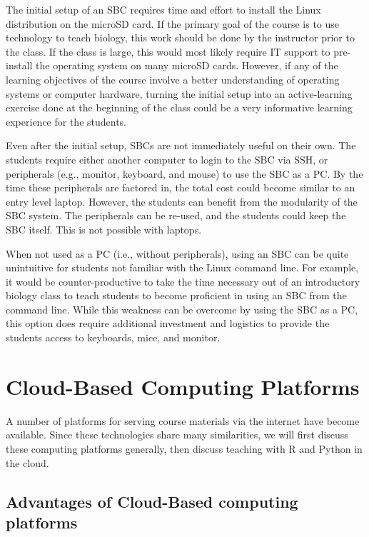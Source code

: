 The initial setup of an SBC requires time and effort to install the
Linux distribution on the microSD card.
If the primary goal of the course is to use technology to teach biology,
this work should be done by the instructor prior to the class.
If the class is large, this would most likely require IT support to pre-install
the operating system on many microSD cards.
However, if any of the learning objectives of the course involve
a better understanding of operating systems or computer hardware,
turning the initial setup into an active-learning exercise done
at the beginning of the class could be a very informative
learning experience for the students.

Even after the initial setup, SBCs are not immediately useful on their own.
The students require either another computer to login to the SBC via SSH, or
peripherals (e.g., monitor, keyboard, and mouse) to use the SBC as a PC.
By the time these peripherals are factored in, the total cost could become
similar to an entry level laptop.
However, the students can benefit from the modularity of the SBC system.
The peripherals can be re-used, and the students could keep the SBC itself.
This is not possible with laptops.

When not used as a PC (i.e., without peripherals), using an SBC can be
quite unintuitive for students not familiar with the Linux command line.
For example, it would be counter-productive to take the time necessary
out of an introductory biology class to teach students to become proficient
in using an SBC from the command line.
While this weakness can be overcome by using the SBC as a PC, this option does
require additional investment and logistics to provide the students access to
keyboards, mice, and monitor.


\section{Cloud-Based Computing Platforms}

A number of platforms for serving course materials via the internet have become available. 
Since these technologies share many similarities, we will first discuss these computing platforms generally,
then discuss teaching with R and Python in the cloud.


\subsection{Advantages of Cloud-Based computing platforms}\label{subsub:cloud-advantage}

